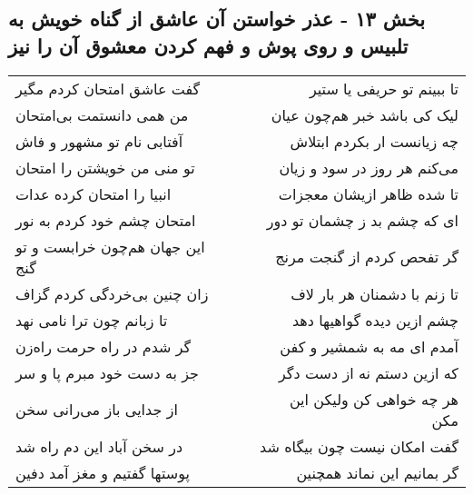 \begin{center}
\section*{بخش ۱۳ - عذر خواستن آن عاشق از گناه خویش به تلبیس و روی پوش و فهم کردن معشوق آن را نیز}
\label{sec:sh013}
\begin{longtable}{l p{0.5cm} r}
گفت عاشق امتحان کردم مگیر
&&
تا ببینم تو حریفی یا ستیر
\\
من همی دانستمت بی‌امتحان
&&
لیک کی باشد خبر هم‌چون عیان
\\
آفتابی نام تو مشهور و فاش
&&
چه زیانست ار بکردم ابتلاش
\\
تو منی من خویشتن را امتحان
&&
می‌کنم هر روز در سود و زیان
\\
انبیا را امتحان کرده عدات
&&
تا شده ظاهر ازیشان معجزات
\\
امتحان چشم خود کردم به نور
&&
ای که چشم بد ز چشمان تو دور
\\
این جهان هم‌چون خرابست و تو گنج
&&
گر تفحص کردم از گنجت مرنج
\\
زان چنین بی‌خردگی کردم گزاف
&&
تا زنم با دشمنان هر بار لاف
\\
تا زبانم چون ترا نامی نهد
&&
چشم ازین دیده گواهیها دهد
\\
گر شدم در راه حرمت راه‌زن
&&
آمدم ای مه به شمشیر و کفن
\\
جز به دست خود مبرم پا و سر
&&
که ازین دستم نه از دست دگر
\\
از جدایی باز می‌رانی سخن
&&
هر چه خواهی کن ولیکن این مکن
\\
در سخن آباد این دم راه شد
&&
گفت امکان نیست چون بیگاه شد
\\
پوستها گفتیم و مغز آمد دفین
&&
گر بمانیم این نماند همچنین
\\
\end{longtable}
\end{center}
